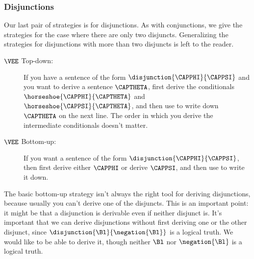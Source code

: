 \begin{gproof}
\end{gproof}

\subsubsection*{Disjunctions}
Our last pair of strategies is for disjunctions. As with conjunctions, we give the strategies for the case where there are only two disjuncts. Generalizing the strategies for disjunctions with more than two disjuncts is left to the reader.
\begin{description}
\item[$\VEE$ Top-down:] If you have a sentence of the form $\disjunction{\CAPPHI}{\CAPPSI}$ and you want to derive a sentence $\CAPTHETA$, first derive the conditionals $\horseshoe{\CAPPHI}{\CAPTHETA}$ and $\horseshoe{\CAPPSI}{\CAPTHETA}$, and then use  to write down $\CAPTHETA$ on the next line. The order in which you derive the intermediate conditionals doesn't matter.
\item[$\VEE$ Bottom-up:] If you want a sentence of the form $\disjunction{\CAPPHI}{\CAPPSI}$, then first derive either $\CAPPHI$ or derive $\CAPPSI$, and then use  to write it down.
\end{description}
The basic bottom-up strategy isn't always the right tool for deriving disjunctions, because usually you can't derive one of the disjuncts. 
This is an important point: it might be that a disjunction is derivable even if neither disjunct is. 
It's important that we can derive disjunctions without first deriving one or the other disjunct, since $\disjunction{\Bl}{\negation{\Bl}}$ is a logical truth. We would like to be able to derive it, though neither $\Bl$ nor $\negation{\Bl}$ is a logical truth.

